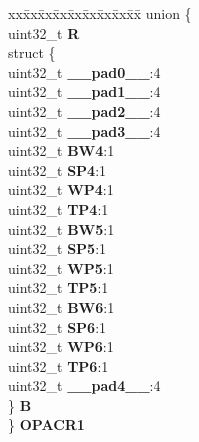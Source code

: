 \begin{DoxyCompactItemize}
\begin{tabbing}
\end{tabbing}\item 
\mbox{\label{structPBRIDGE__B__tag_af0cfda510284de7f62f2fb34378f8a15}} 
\begin{tabbing}
xx\=xx\=xx\=xx\=xx\=xx\=xx\=xx\=xx\=\kill
union \{\\
\>uint32\_t {\bfseries R}\\
\>struct \{\\
\>\>uint32\_t {\bfseries \_\_pad0\_\_}:4\\
\>\>uint32\_t {\bfseries \_\_pad1\_\_}:4\\
\>\>uint32\_t {\bfseries \_\_pad2\_\_}:4\\
\>\>uint32\_t {\bfseries \_\_pad3\_\_}:4\\
\>\>uint32\_t {\bfseries BW4}:1\\
\>\>uint32\_t {\bfseries SP4}:1\\
\>\>uint32\_t {\bfseries WP4}:1\\
\>\>uint32\_t {\bfseries TP4}:1\\
\>\>uint32\_t {\bfseries BW5}:1\\
\>\>uint32\_t {\bfseries SP5}:1\\
\>\>uint32\_t {\bfseries WP5}:1\\
\>\>uint32\_t {\bfseries TP5}:1\\
\>\>uint32\_t {\bfseries BW6}:1\\
\>\>uint32\_t {\bfseries SP6}:1\\
\>\>uint32\_t {\bfseries WP6}:1\\
\>\>uint32\_t {\bfseries TP6}:1\\
\>\>uint32\_t {\bfseries \_\_pad4\_\_}:4\\
\>\} {\bfseries B}\\
\} {\bfseries OPACR1}\\


\end{tabbing}
\end{DoxyCompactItemize}
